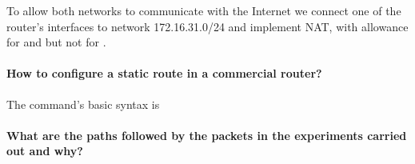 \documentclass[compilation.tex]{subfiles}
\begin{document}
To allow both networks to communicate with the Internet we connect one of the router's interfaces to network 172.16.31.0/24 and implement NAT, with allowance for  and  but not for .

\paragraph{How to configure a static route in a commercial router?}
The command's basic syntax is
\begin{center}
\end{center}

\paragraph{What are the paths followed by the packets in the experiments carried out and why?}
\end{document}
